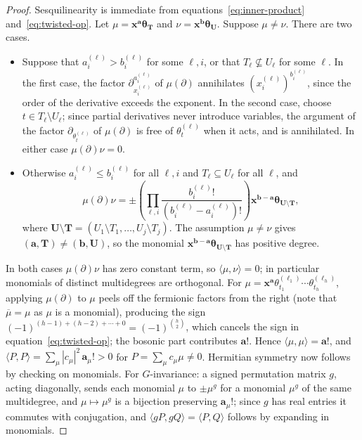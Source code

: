 \documentclass[12pt]{amsart}
\theoremstyle{plain}
\theoremstyle{definition}
\begin{document}
\begin{proof}
Sesquilinearity is immediate from equations~\eqref{eq:inner-product} and~\eqref{eq:twisted-op}. 
Let $\mu = \bm{x}^{\bm{a}}\bm{\theta}_{\bm{T}}$ and $\nu = \bm{x}^{\bm{b}}\bm{\theta}_{\bm{U}}$.
Suppose $\mu \neq \nu$. 
There are two cases.
  \begin{itemize}
   \item Suppose that $a_i^{(\ell)} > b_i^{(\ell)}$ for some $\ell, i$, or that $T_\ell \not\subseteq U_\ell$ for some $\ell$.
    In the first case, the factor $\partial_{x_i^{(\ell)}}^{a_i^{(\ell)}}$ of $\mu(\partial)$ annihilates $(x_i^{(\ell)})^{b_i^{(\ell)}}$, since the order of the derivative exceeds the exponent.
    In the second case, choose $t \in T_\ell \setminus U_\ell$; since partial derivatives never introduce variables, the argument of the factor $\partial_{\theta_t^{(\ell)}}$ of $\mu(\partial)$ is free of $\theta_t^{(\ell)}$ when it acts, and is annihilated.
    In either case $\mu(\partial) \nu = 0$.
   \item Otherwise $a_i^{(\ell)} \leq b_i^{(\ell)}$ for all $\ell, i$ and $T_\ell \subseteq U_\ell$ for all $\ell$, and
    \begin{equation}
        \mu(\partial) \nu = \pm \left( \prod_{\ell, i}
      \frac{b_i^{(\ell)}!}{\left( b_i^{(\ell)} - a_i^{(\ell)} \right)!} \right)
      \bm{x}^{\bm{b} - \bm{a}} \bm{\theta}_{\bm{U} \setminus \bm{T}},
    \end{equation}
    where $\bm{U} \setminus \bm{T} = (U_1 \setminus T_1, \dots, U_j \setminus T_j)$. 
    The assumption $\mu \neq \nu$ gives $(\bm{a}, \bm{T}) \neq (\bm{b}, \bm{U})$, so the monomial $\bm{x}^{\bm{b} - \bm{a}} \bm{\theta}_{\bm{U} \setminus \bm{T}}$ has positive degree.
  \end{itemize}
  In both cases $\mu(\partial) \nu$ has zero constant term, so $\langle \mu, \nu \rangle = 0$; in particular monomials of distinct multidegrees are orthogonal. 
For $\mu = \bm{x}^{\bm{a}} \theta_{t_1}^{(\ell_1)} \cdots \theta_{t_h}^{(\ell_h)}$, applying $\mu(\partial)$ to $\mu$ peels off the fermionic factors from the right (note that $\overline{\mu} = \mu$ as $\mu$ is a monomial), producing the sign $(-1)^{(h-1) + (h-2) + \cdots + 0} = (-1)^{\binom{h}{2}}$, which cancels the sign in equation~\eqref{eq:twisted-op}; the bosonic part contributes $\bm{a}!$. 
Hence $\langle \mu, \mu\rangle = \bm{a}!$, and $\langle P, P \rangle = \sum_\mu |c_\mu|^2\, \bm{a}_\mu! > 0$ for $P = \sum_\mu c_\mu \mu \neq 0$. 
Hermitian symmetry now follows by checking on monomials. 
For $G$-invariance: a signed permutation matrix $g$, acting diagonally, sends each monomial $\mu$ to $\pm \mu^g$ for a monomial $\mu^g$ of the same multidegree, and $\mu \mapsto \mu^g$ is a bijection preserving $\bm{a}_\mu!$; since $g$ has real entries it commutes with conjugation, and $\langle g P, g Q \rangle = \langle P, Q \rangle$ follows by expanding in monomials.
\end{proof}
\end{document}
